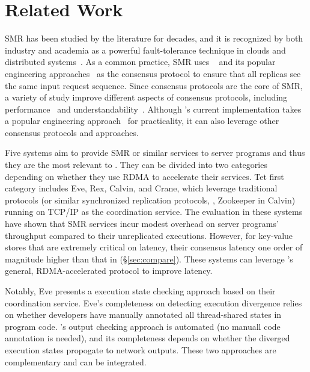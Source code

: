 \section{Related Work} \label{sec:related}


   SMR 
has been studied by the literature 
for decades, and it is recognized by both industry and academia as a powerful 
fault-tolerance technique in clouds and distributed 
systems~\cite{lamportclock,smr:tutorial}. As a common practice, SMR uses 
\paxos~\cite{paxos,paxos:simple,paxos:complex} and its popular engineering 
approaches~\cite{paxos:live,paxos:practical} as the consensus protocol to 
ensure that all replicas see the same input request sequence. Since consensus 
protocols are the core of SMR, a variety of study improve different aspects of 
consensus protocols, including performance~\cite{epaxos:sosp13,paxos:fast} and 
understandability~\cite{raft:usenix14}. Although \xxx's current implementation 
takes a popular engineering approach~\cite{paxos:practical} for practicality, 
it can also leverage other consensus protocols and approaches.

Five systems aim to provide SMR or similar services to server programs and 
thus they are the most relevant to \xxx. They can be divided into two 
categories depending on whether they use RDMA to accelerate their services. 
Tet first category includes Eve, Rex, Calvin, and Crane, which 
leverage traditional \paxos protocols (or similar synchronized replication 
protocols, \eg, Zookeeper in Calvin) running on TCP/IP as the coordination 
service. The evaluation in these systems have shown that SMR services incur 
modest overhead on server programs' throughput compared to their unreplicated 
executions. However, for key-value stores that are extremely critical on 
latency, their consensus latency one order of magnitude higher than that in 
\xxx (\S\ref{sec:compare}). These systems can leverage \xxx's general, 
RDMA-accelerated protocol to improve latency.


Notably, Eve presents a execution state checking approach based on their 
coordination service. Eve's completeness on detecting execution divergence 
relies on whether developers have manually annotated all thread-shared states 
in program code. \xxx's output checking approach is automated (no manuall code 
annotation is needed), and its completeness depends on whether the diverged 
execution states propogate to network outputs. These two approaches are 
complementary and can be integrated.

